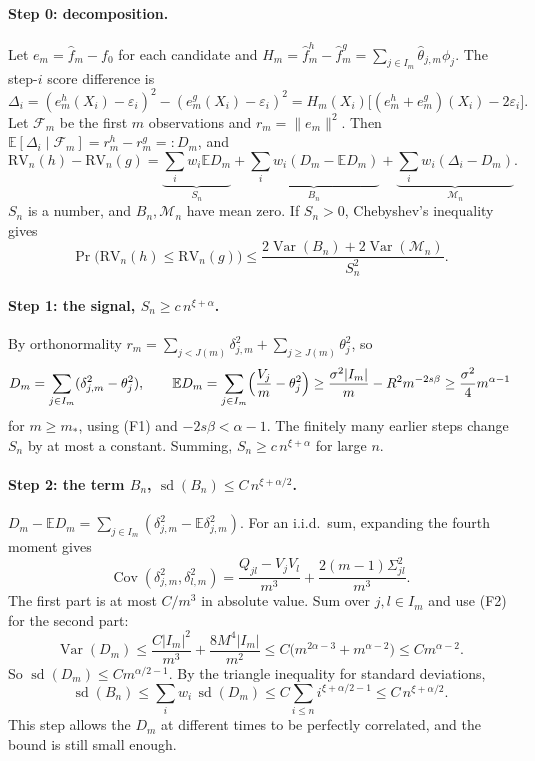 \documentclass[11pt]{article}
\newcommand{\E}{\mathbb{E}}
\newcommand{\Var}{\operatorname{Var}}
\newcommand{\sd}{\operatorname{sd}}
\newcommand{\RV}{\mathrm{RV}}
\begin{document}
\paragraph{Step 0: decomposition.} Let $e_m=\hat f_m-f_0$ for each candidate and $H_m=\hat f^h_m-\hat f^g_m=\sum_{j\in I_m}\hat\theta_{j,m}\phi_j$. The step-$i$ score difference is
\[
\Delta_i=(e^h_m(X_i)-\varepsilon_i)^2-(e^g_m(X_i)-\varepsilon_i)^2=H_m(X_i)\bigl[(e^h_m+e^g_m)(X_i)-2\varepsilon_i\bigr].
\]
Let $\mathcal F_m$ be the first $m$ observations and $r_m=\|e_m\|^2$. Then $\E[\Delta_i\mid\mathcal F_m]=r^h_m-r^g_m=:D_m$, and
\[
\RV_n(h)-\RV_n(g)=\underbrace{\textstyle\sum_iw_i\E D_m}_{S_n}+\underbrace{\textstyle\sum_iw_i(D_m-\E D_m)}_{B_n}+\underbrace{\textstyle\sum_iw_i(\Delta_i-D_m)}_{\mathcal M_n}.
\]
$S_n$ is a number, and $B_n,\mathcal M_n$ have mean zero. If $S_n>0$, Chebyshev's inequality gives
\begin{equation}\label{eq:cheb}
\Pr\bigl(\RV_n(h)\le\RV_n(g)\bigr)\le\frac{2\Var(B_n)+2\Var(\mathcal M_n)}{S_n^2}.
\end{equation}

\paragraph{Step 1: the signal, $S_n\ge c\,n^{\xi+\alpha}$.} By orthonormality $r_m=\sum_{j<J(m)}\delta_{j,m}^2+\sum_{j\ge J(m)}\theta_j^2$, so
\[
D_m=\sum_{j\in I_m}(\delta_{j,m}^2-\theta_j^2),\qquad
\E D_m=\sum_{j\in I_m}\Bigl(\frac{V_j}{m}-\theta_j^2\Bigr)\ge\frac{\sigma^2|I_m|}{m}-R^2m^{-2s\beta}\ge\frac{\sigma^2}{4}m^{\alpha-1}
\]
for $m\ge m_*$, using (F1) and $-2s\beta<\alpha-1$. The finitely many earlier steps change $S_n$ by at most a constant. Summing, $S_n\ge c\,n^{\xi+\alpha}$ for large $n$.

\paragraph{Step 2: the term $B_n$, $\sd(B_n)\le C\,n^{\xi+\alpha/2}$.} $D_m-\E D_m=\sum_{j\in I_m}(\delta_{j,m}^2-\E\delta_{j,m}^2)$. For an i.i.d.\ sum, expanding the fourth moment gives
\[
\operatorname{Cov}(\delta_{j,m}^2,\delta_{l,m}^2)=\frac{Q_{jl}-V_jV_l}{m^3}+\frac{2(m-1)\Sigma_{jl}^2}{m^3}.
\]
The first part is at most $C/m^3$ in absolute value. Sum over $j,l\in I_m$ and use (F2) for the second part:
\[
\Var(D_m)\le\frac{C|I_m|^2}{m^3}+\frac{8M^4|I_m|}{m^2}\le C\bigl(m^{2\alpha-3}+m^{\alpha-2}\bigr)\le Cm^{\alpha-2}.
\]
So $\sd(D_m)\le Cm^{\alpha/2-1}$. By the triangle inequality for standard deviations,
\[
\sd(B_n)\le\sum_iw_i\,\sd(D_m)\le C\sum_{i\le n}i^{\xi+\alpha/2-1}\le C\,n^{\xi+\alpha/2}.
\]
This step allows the $D_m$ at different times to be perfectly correlated, and the bound is still small enough.
\end{document}
